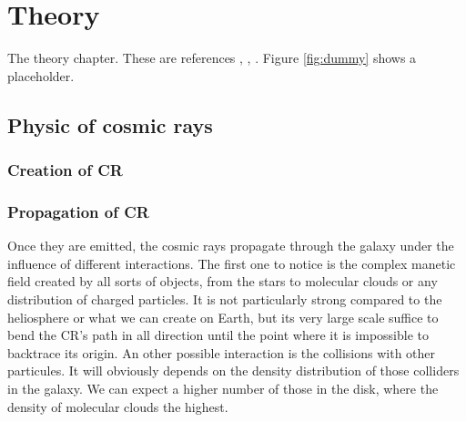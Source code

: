 \chapter{Theory}
\label{ch:theory}
The theory chapter. These are references \cite{aPaper}, \cite{aThesis}, \cite{aWiki}. Figure \ref{fig:dummy} shows a placeholder. 
%
%


\section{Physic of cosmic rays}


\subsection{Creation of CR}


\subsection{Propagation of CR}

Once they are emitted, the cosmic rays propagate through the galaxy under the influence of different interactions.
The first one to notice is the complex manetic field created by all sorts of objects, from the stars to molecular clouds or any distribution of charged particles. It is not particularly strong  compared to the heliosphere or what we can create on Earth, but its very large scale suffice to bend the CR's path in all direction until the point where it is impossible to backtrace its origin.
An other possible interaction is the collisions with other particules. It will obviously depends on the density distribution of those colliders in the galaxy. We can expect a higher number of those in the disk, where the density of molecular clouds the highest.

